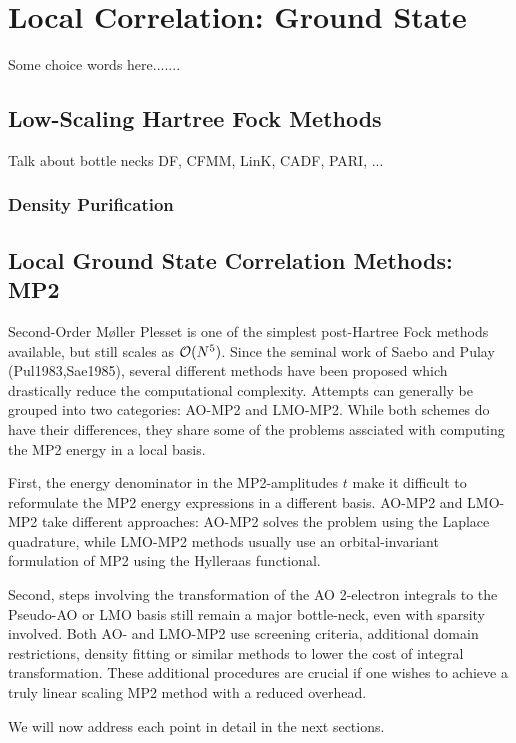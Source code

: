 \chapter{Local Correlation: Ground State}

Some choice words here.......

\section{Low-Scaling Hartree Fock Methods}

Talk about bottle necks
DF, CFMM, LinK, CADF, PARI, ...

\subsection{Density Purification}


\section{Local Ground State Correlation Methods: MP2}

Second-Order M{\o}ller Plesset is one of the simplest post-Hartree Fock methods available, but still scales as $\mathcal{O}(N^{5})$. Since the seminal work of Saebo and Pulay (Pul1983,Sae1985), several different methods have been proposed which drastically reduce the computational complexity. Attempts can generally be grouped into two categories: AO-MP2 and LMO-MP2. While both schemes do have their differences, they share some of the problems assciated with computing the MP2 energy in a local basis.

First, the energy denominator in the MP2-amplitudes $t$ make it difficult to reformulate the MP2 energy expressions in a different basis. AO-MP2 and LMO-MP2 take different approaches: AO-MP2 solves the problem using the Laplace quadrature, while LMO-MP2 methods usually use an orbital-invariant formulation of MP2 using the Hylleraas functional.

Second, steps involving the transformation of the AO 2-electron integrals to the Pseudo-AO or LMO basis still remain a major bottle-neck, even with sparsity involved. Both AO- and LMO-MP2 use screening criteria, additional domain restrictions, density fitting or similar methods to lower the cost of integral transformation. These additional procedures are crucial if one wishes to achieve a truly linear scaling MP2 method with a reduced overhead.

We will now address each point in detail in the next sections.

